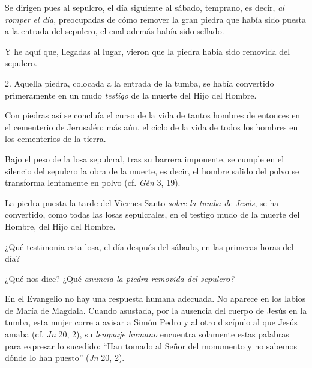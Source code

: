 			\begin{body}Se dirigen pues al sepulcro, el día siguiente al sábado, temprano, es decir, \textit{al romper el día}, preocupadas de cómo remover la gran piedra que había sido puesta a la entrada del sepulcro, el cual además había sido sellado.\end{body}
			
			\begin{body}Y he aquí que, llegadas al lugar, vieron que la piedra había sido removida del sepulcro.\end{body}
			
			\begin{body}2. Aquella piedra, colocada a la entrada de la tumba, se había convertido primeramente en un mudo \textit{testigo} de la muerte del Hijo del Hombre.\end{body}
			
			\begin{body}Con piedras así se concluía el curso de la vida de tantos hombres de entonces en el cementerio de Jerusalén; más aún, el ciclo de la vida de todos los hombres en los cementerios de la tierra.\end{body}
			
			\begin{body}Bajo el peso de la losa sepulcral, tras su barrera imponente, se cumple en el silencio del sepulcro la obra de la muerte, es decir, el hombre salido del polvo se transforma lentamente en polvo (cf. \textit{Gén} 3, 19).\end{body}
			
			\begin{body}La piedra puesta la tarde del Viernes Santo \textit{sobre la tumba de Jesús}, se ha convertido, como todas las losas sepulcrales, en el testigo mudo de la muerte del Hombre, del Hijo del Hombre.\end{body}
			
			\begin{body}¿Qué testimonia esta losa, el día después del sábado, en las primeras horas del día?\end{body}
			
			\begin{body}¿Qué nos dice? ¿Qué \textit{anuncia la piedra removida del sepulcro?}\end{body}
			
			\begin{body}En el Evangelio no hay una respuesta humana adecuada. No aparece en los labios de María de Magdala. Cuando asustada, por la ausencia del cuerpo de Jesús en la tumba, esta mujer corre a avisar a Simón Pedro y al otro discípulo al que Jesús amaba (cf. \textit{Jn }20, 2), su \textit{lenguaje humano} encuentra solamente estas palabras para expresar lo sucedido: “Han tomado al Señor del monumento y no sabemos dónde lo han puesto” (\textit{Jn} 20, 2).\end{body}
			
